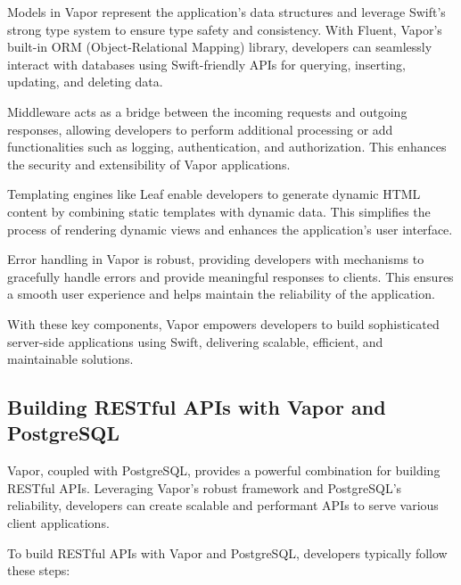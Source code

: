 \documentclass[
  biblatex,
  language=english,
  figures=false,
  sourcecodes,
  glossaries,
  index
]{kidiplom}
\begin{document}
Models in Vapor represent the application's data structures and leverage Swift's strong type system to ensure type safety and consistency. With Fluent, Vapor's built-in ORM (Object-Relational Mapping) library, developers can seamlessly interact with databases using Swift-friendly APIs for querying, inserting, updating, and deleting data.

Middleware acts as a bridge between the incoming requests and outgoing responses, allowing developers to perform additional processing or add functionalities such as logging, authentication, and authorization. This enhances the security and extensibility of Vapor applications.

Templating engines like Leaf enable developers to generate dynamic HTML content by combining static templates with dynamic data. This simplifies the process of rendering dynamic views and enhances the application's user interface.

Error handling in Vapor is robust, providing developers with mechanisms to gracefully handle errors and provide meaningful responses to clients. This ensures a smooth user experience and helps maintain the reliability of the application.

With these key components, Vapor empowers developers to build sophisticated server-side applications using Swift, delivering scalable, efficient, and maintainable solutions.

\subsection{Building RESTful APIs with Vapor and PostgreSQL}

Vapor, coupled with PostgreSQL, provides a powerful combination for building RESTful APIs. Leveraging Vapor's robust framework and PostgreSQL's reliability, developers can create scalable and performant APIs to serve various client applications.

To build RESTful APIs with Vapor and PostgreSQL, developers typically follow these steps:
\end{document}
